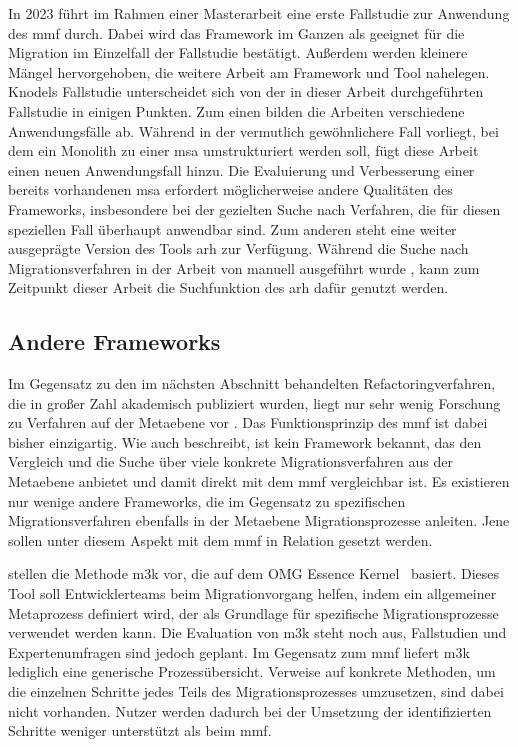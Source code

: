 In 2023 führt \citeauthor{master-marvin-knodel} im Rahmen einer Masterarbeit \cite{master-marvin-knodel} eine erste Fallstudie zur Anwendung des \gls{mmf} durch.
Dabei wird das Framework im Ganzen als geeignet für die Migration im Einzelfall der Fallstudie bestätigt.
Außerdem werden kleinere Mängel hervorgehoben, die weitere Arbeit am Framework und Tool nahelegen.
Knodels Fallstudie unterscheidet sich von der in dieser Arbeit durchgeführten Fallstudie in einigen Punkten.
Zum einen bilden die Arbeiten verschiedene Anwendungsfälle ab.
Während in  der vermutlich gewöhnlichere Fall vorliegt, bei dem ein Monolith zu einer \gls{msa} umstrukturiert werden soll, fügt diese Arbeit einen neuen Anwendungsfall hinzu.
Die Evaluierung und Verbesserung einer bereits vorhandenen \gls{msa} erfordert möglicherweise andere Qualitäten des Frameworks, insbesondere bei der gezielten Suche nach Verfahren, die für diesen speziellen Fall überhaupt anwendbar sind.
Zum anderen steht eine weiter ausgeprägte Version des Tools \gls{arh} zur Verfügung.
Während die Suche nach Migrationsverfahren in der Arbeit von \citeauthor{master-marvin-knodel} manuell ausgeführt wurde \cite{master-marvin-knodel}, kann zum Zeitpunkt dieser Arbeit die Suchfunktion des \gls{arh} dafür genutzt werden.

\subsection{Andere Frameworks}

Im Gegensatz zu den im nächsten Abschnitt behandelten Refactoringverfahren, die in großer Zahl akademisch publiziert wurden, liegt nur sehr wenig Forschung zu Verfahren auf der Metaebene vor \cite{on-a-metaprocess}.
Das Funktionsprinzip des \gls{mmf} ist dabei bisher einzigartig.
Wie auch  beschreibt, ist kein Framework bekannt, das den Vergleich und die Suche über viele konkrete Migrationsverfahren aus der Metaebene anbietet und damit direkt mit dem \gls{mmf} vergleichbar ist.
Es existieren nur wenige andere Frameworks, die im Gegensatz zu spezifischen Migrationsverfahren ebenfalls in der Metaebene Migrationsprozesse anleiten.
Jene sollen unter diesem Aspekt mit dem \gls{mmf} in Relation gesetzt werden.

 stellen die Methode \gls{m3k} vor, die auf dem OMG Essence Kernel~\cite{essence-kernel-omg} basiert.
Dieses Tool soll Ent\-wick\-ler\-teams beim Migrationvorgang helfen, indem ein allgemeiner Metaprozess definiert wird, der als Grundlage für spezifische Migrationsprozesse verwendet werden kann.
Die Evaluation von \gls{m3k} steht noch aus, Fallstudien und Expertenumfragen sind jedoch geplant.
Im Gegensatz zum \gls{mmf} liefert \gls{m3k} lediglich eine generische Prozessübersicht.
Verweise auf konkrete Methoden, um die einzelnen Schritte jedes Teils des Migrationsprozesses umzusetzen, sind dabei nicht vorhanden.
Nutzer werden dadurch bei der Umsetzung der identifizierten Schritte weniger unterstützt als beim \gls{mmf}.

